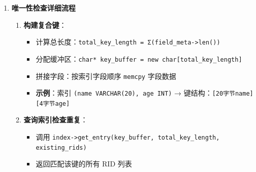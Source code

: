 \documentclass[a4paper, 12pt]{article}
\begin{document}
\begin{enumerate}
\begin{enumerate}
        \item \textbf{数据记录更新}：
        
\begin{itemize}
            \item 先删除旧记录：\texttt{record\_handler\_->delete\_record()}
            \item 再插入新记录：保持相同 RID 实现原地更新
        \end{itemize}
        
        \item \textbf{更新顺序}：
        
\begin{itemize}
            \item \textcolor{blue}{先更新索引再更新数据}：保证一致性
            \item 若先更新数据后更新索引失败，会导致数据与索引不一致
            \item 先更新索引可提前发现唯一性冲突
        \end{itemize}
    \end{enumerate}
    
    \item \textbf{唯一性检查详细流程}
    
\begin{enumerate}
        \item \textbf{构建复合键}：
        \begin{itemize}
            \item 计算总长度：\texttt{total\_key\_length = Σ(field\_meta->len())}
            \item 分配缓冲区：\texttt{char* key\_buffer = new char[total\_key\_length]}
            \item 拼接字段：按索引字段顺序 \texttt{memcpy} 字段数据
            \item \textbf{示例}：索引 \texttt{(name VARCHAR(20), age INT)} → 键结构：\texttt{[20字节name][4字节age]}
        \end{itemize}
        
        \item \textbf{查询索引检查重复}：
        
\begin{itemize}
            \item 调用 \texttt{index->get\_entry(key\_buffer, total\_key\_length, existing\_rids)}
            \item 返回匹配该键的所有 RID 列表
        \end{itemize}
        

\end{enumerate}
\end{enumerate}
\end{document}
